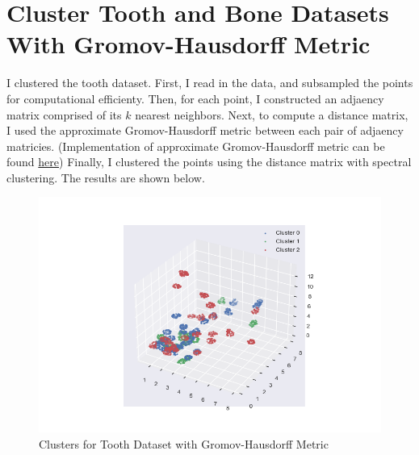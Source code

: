 \documentclass{article}
\begin{document}
        \clearpage

\section{Cluster Tooth and Bone Datasets With Gromov-Hausdorff Metric}

    I clustered the tooth dataset. First, I read in the data, and subsampled the points for computational efficienty. Then, for each point, I constructed an adjaency matrix comprised of its $k$ nearest neighbors. Next, to compute a distance matrix, I used the approximate Gromov-Hausdorff metric between each pair of adjaency matricies. (Implementation of approximate Gromov-Hausdorff metric can be found \href{https://persim.scikit-tda.org/en/latest/index.html}{here}) Finally, I clustered the points using the distance matrix with spectral clustering. The results are shown below.

    \begin{figure}[h]
        \includegraphics[width=\linewidth]{images/q8/gromov_hausdorff_clusters.png}
        \caption{Clusters for Tooth Dataset with Gromov-Hausdorff Metric}
    \end{figure}

    \clearpage
\end{document}
